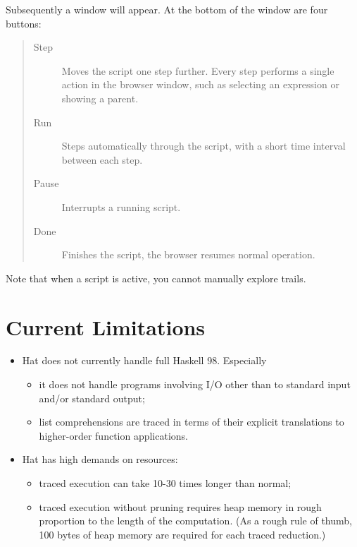 \documentclass[12pt]{article}
\begin{document}
Subsequently a window will appear. At the bottom of the window are four buttons:
\begin{quote}
\begin{description}
\item[Step] Moves the script one step further. Every step performs a single action in the browser window, such as selecting an expression or showing a parent.
\item[Run] Steps automatically through the script, with a short time interval
between each step.
\item[Pause] Interrupts a running script.
\item[Done] Finishes the script, the browser resumes normal operation.
\end{description}
\end{quote}
Note that when a script is active, you cannot manually explore trails.




\section{Current Limitations}

\begin{itemize}
\item
Hat does not currently handle full Haskell 98. Especially
\begin{itemize}
\item
it does not handle programs involving
I/O other than to standard input and/or standard output;
\item
list comprehensions are traced in terms of their explicit
translations to higher-order function applications.
\end{itemize}

\item
Hat has high demands on resources:
\begin{itemize}
\item
traced execution can take 10-30 times longer than normal;
\item
traced execution without pruning requires heap memory in
rough proportion to the length of the computation.
(As a rough rule of thumb, 100 bytes of heap memory are
required for each traced reduction.)
\end{itemize}

\end{itemize}
\end{document}
